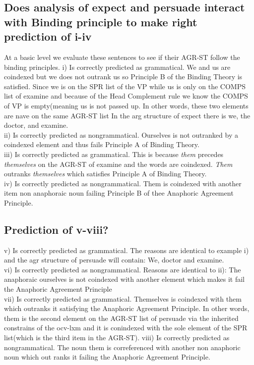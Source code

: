 \documentclass{article}
\begin{document}
\subsection{Does analysis of expect and persuade interact with Binding principle to make right prediction of i-iv}
At a basic level we evaluate these sentences to see if their AGR-ST follow the binding principles.
i) Is correctly predicted as grammatical. We and us are coindexed but we does not outrank us so Principle B of the Binding Theory is satisfied. Since we is on the SPR list of the VP while us is only on the COMPS list of examine and because of the Head Complement rule we know the COMPS of VP is empty(meaning us is not passed up. In other words, these two elements are nave on the same AGR-ST list  In the arg structure of expect there is we, the doctor, and examine.  \\
ii) Is correctly predicted as nongrammatical. Ourselves is not outranked by a coindexed element and thus fails Principle A of Binding Theory. \\
iii) Is correctly predicted as grammatical. This is because {\it them} precedes {\it themselves} on the AGR-ST of examine and the words are coindexed. {\it Them} outranks {\it themselves} which satisfies Principle A of Binding Theory. \\
iv) Is correctly predicted as nongrammatical. Them is coindexed with another item non anaphoraic noun failing Principle B of thee Anaphoric Agreement Principle.
\subsection{Prediction of v-viii?}
v) Is correctly predicted as grammatical. The reasons are identical to example i) and the agr structure of persuade will contain: We, doctor and examine. \\
vi) Is correctly predicted as nongrammatical. Reasons are identical to ii): The anaphoraic ourselves is not coindexed with another element which makes it fail the Anaphoric Agreement Principle \\
vii) Is correctly predicted as grammatical. Themselves is coindexed with them which outranks it satisfying the Anaphoric Agreement Principle. In other words, them is the second element on the AGR-ST list of persuade via the inherited constrains of the ocv-lxm and it is conindexed with the sole element of the SPR list(which is the third item in the AGR-ST).
viii) Is correctly predicted as nongrammatical. The noun them is correferenced with another non anaphoric noun which out ranks it failing the Anaphoric Agreement Principle. \\
\end{document}
